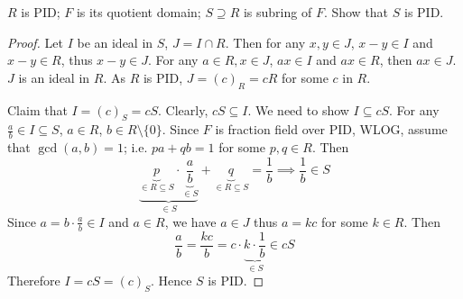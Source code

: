 \begin{exercise}
$R$ is PID; $F$ is its quotient domain; $S\supseteq R$ is subring of $F$. Show that $S$ is PID.
\end{exercise}
\begin{proof}
Let $I$ be an ideal in $S$, $J=I\cap R$. Then for any $x, y\in J$, $x-y\in I$ and $x-y\in R$, thus $x-y\in J$. For any $a\in R, x\in J$, $ax\in I$ and $ax\in R$, then $ax\in J$. $J$ is an ideal in $R$. As $R$ is PID, $J=(c)_{R}=cR$ for some $c$ in $R$.

Claim that $I=(c)_{S}=cS$. Clearly, $cS\subseteq I$. We need to show $I\subseteq cS$. For any $\frac{a}{b}\in I\subseteq S$, $a\in R$, $b\in R\setminus \{ 0 \}$. Since $F$ is fraction field over PID, WLOG, assume that $\gcd(a,b)=1$; i.e. $pa+qb=1$ for some $p, q\in R$. Then
\[
\underbrace{ \underbrace{ p }_{ \in R\subseteq S }\cdot\underbrace{ \frac{a}{b} }_{ \in S } }_{ \in S }+\underbrace{ q }_{ \in R\subseteq S }=\frac{1}{b}\implies \frac{1}{b}\in S
\]
Since $a=b\cdot\frac{a}{b}\in I$ and $a\in R$, we have $a\in J$ thus $a=kc$ for some $k\in R$. Then
\[
\frac{a}{b}=\frac{kc}{b}=c\cdot \underbrace{ k\cdot\frac{1}{b} }_{ \in S }\in cS
\]
Therefore $I=cS=(c)_{S}$. Hence $S$ is PID.

\end{proof}
